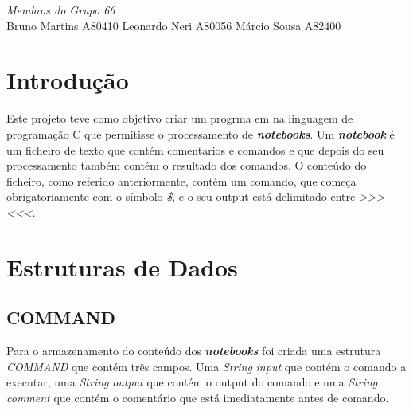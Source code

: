 \begin{titlepage}
\Large \emph{Membros do Grupo 66}\\
Bruno Martins A80410
Leonardo Neri A80056
Márcio Sousa A82400




 

\vfill %

\end{titlepage}

\section{Introdução}
Este projeto teve como objetivo criar um progrma em na linguagem de programação C que permitisse o processamento de \textbf{\textit{notebooks}}. Um \textbf{\textit{notebook}} é um ficheiro de texto que contém comentarios e comandos e que depois do seu processamento também contém o resultado dos comandos.
O conteúdo do ficheiro, como referido anteriormente, contém um comando, que começa obrigatoriamente com o símbolo \textit{\$}, e o seu output está delimitado entre \textit{>>> <<<}.  

\section{Estruturas de Dados}



\subsection{COMMAND}

Para o armazenamento do conteúdo dos \textbf{\textit{notebooks}} foi criada uma estrutura \textit{COMMAND} que contém três campos. Uma \textit{String} \textit{\textit{input}} que contém o comando a executar, uma \textit{String} \textit{\textit{output}} que contém o output do comando e uma \textit{String} \textit{\textit{comment}} que contém o comentário que está imediatamente antes de comando. 

